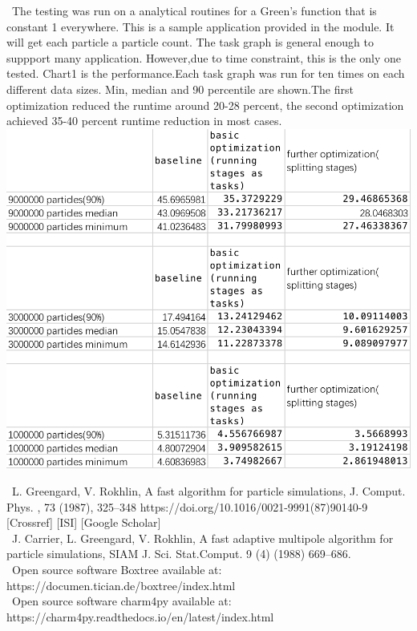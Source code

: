 \documentclass[final,t]{beamer}
\begin{document}
\begin{frame}[fragile]{}
\begin{columns}[t]
\begin{column}{.45\linewidth}
      \begin{tcolorbox}[toplevelbox,adjusted title=Results]
        \  The testing was run on a analytical routines for a Green's function that is
        constant 1 everywhere. This is a sample application provided in the module. It will get each particle a particle count. The task graph is general enough to suppport many application. However,due to time constraint, this is the only one tested. Chart1 is the performance.Each task graph was run for ten times on each different data sizes. Min, median and 90 percentile are shown.The first optimization reduced the runtime around 20-28 percent, the second optimization 
        achieved 35-40 percent runtime reduction in most cases. 
        \includegraphics{chart}
      \end{tcolorbox}

      \begin{tcolorbox}[toplevelbox,adjusted title=References]
        \ L. Greengard, V. Rokhlin, A fast algorithm for particle simulations, J. Comput. Phys. , 73 (1987), 325–348 https://doi.org/10.1016/0021-9991(87)90140-9 [Crossref] [ISI] [Google Scholar]\\

        \ J. Carrier, L. Greengard, V. Rokhlin, A fast adaptive multipole algorithm for particle simulations, SIAM J. Sci. Stat.Comput. 9 (4) (1988) 669–686.\\

        \ Open source software Boxtree available at: https://documen.tician.de/boxtree/index.html\\
        \ Open source software charm4py available at: https://charm4py.readthedocs.io/en/latest/index.html\\

      \end{tcolorbox}

    \end{column}


  \end{columns}
\end{frame}
\end{document}
